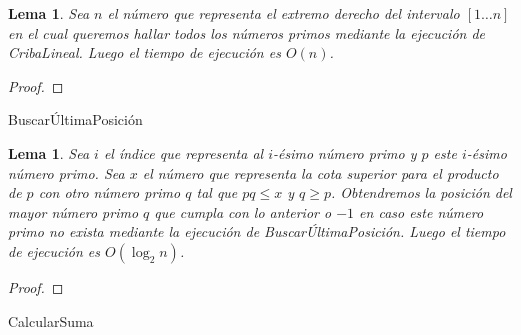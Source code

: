 \documentclass{article}
\DeclarePairedDelimiter\floor{\lfloor}{\rfloor}
\newtheorem{lemma}[theorem]{Lema}
\theoremstyle{definition}
\theoremstyle{remark}
\begin{document}
\begin{lemma}
Sea $n$ el n\'umero que representa el extremo derecho del intervalo $[1 \dots n]$
en el cual queremos hallar todos los n\'umeros primos mediante la ejecuci\'on de CribaLineal. Luego el tiempo de ejecuci\'on es $O(n)$.
\end{lemma}

\begin{proof}
\end{proof}

\begin{algorithm}[H]
\SetAlgoLined
\DontPrintSemicolon
{}
\caption{Buscar\'UltimaPosici\'on\label{BUP}}
\end{algorithm}

\begin{lemma}
Sea $i$ el \'indice que representa al $i$-\'esimo n\'umero primo
y $p$ este $i$-\'esimo n\'umero primo.
Sea $x$ el n\'umero que representa la cota superior para el producto de $p$ con otro n\'umero primo $q$ tal que $pq \leq x$ y $q \geq p$.
Obtendremos la posici\'on del mayor n\'umero primo $q$ que cumpla con lo anterior o
$-1$ en caso este n\'umero primo no exista
mediante la ejecuci\'on de Buscar\'UltimaPosici\'on.
Luego el tiempo de ejecuci\'on es $O(\log_2 n)$.
\end{lemma}

\begin{proof}
\end{proof}

\begin{algorithm}[H]
\SetAlgoLined
\DontPrintSemicolon
{}
\caption{CalcularSuma\label{CS}}
\end{algorithm}
\end{document}

